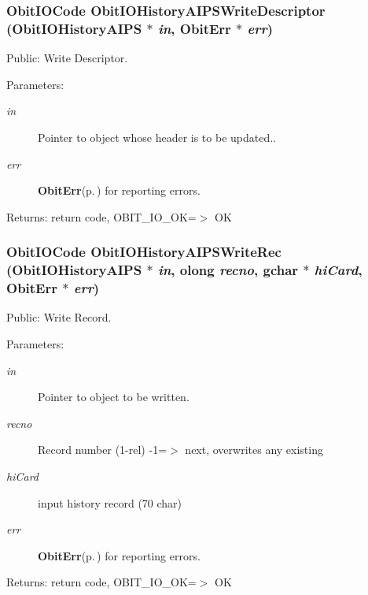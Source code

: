 \subsubsection{\setlength{\rightskip}{0pt plus 5cm}Obit\-IOCode Obit\-IOHistory\-AIPSWrite\-Descriptor ({\bf Obit\-IOHistory\-AIPS} $\ast$ {\em in}, {\bf Obit\-Err} $\ast$ {\em err})}\label{ObitIOHistoryAIPS_8h_a18}


Public: Write Descriptor. 

\begin{Desc}
\item[Parameters:]
\begin{description}
\item[{\em in}]Pointer to object whose header is to be updated.. \item[{\em err}]{\bf Obit\-Err}{\rm (p.\,\pageref{structObitErr})} for reporting errors. \end{description}
\end{Desc}
\begin{Desc}
\item[Returns:]return code, OBIT\_\-IO\_\-OK=$>$ OK \end{Desc}
\subsubsection{\setlength{\rightskip}{0pt plus 5cm}Obit\-IOCode Obit\-IOHistory\-AIPSWrite\-Rec ({\bf Obit\-IOHistory\-AIPS} $\ast$ {\em in}, {\bf olong} {\em recno}, gchar $\ast$ {\em hi\-Card}, {\bf Obit\-Err} $\ast$ {\em err})}\label{ObitIOHistoryAIPS_8h_a15}


Public: Write Record. 

\begin{Desc}
\item[Parameters:]
\begin{description}
\item[{\em in}]Pointer to object to be written. \item[{\em recno}]Record number (1-rel) -1=$>$ next, overwrites any existing \item[{\em hi\-Card}]input history record (70 char) \item[{\em err}]{\bf Obit\-Err}{\rm (p.\,\pageref{structObitErr})} for reporting errors. \end{description}
\end{Desc}
\begin{Desc}
\item[Returns:]return code, OBIT\_\-IO\_\-OK=$>$ OK \end{Desc}

